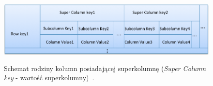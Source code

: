 \begin{figure}[!ht]
 \begin{center}
  \scalebox{0.45}
  {
   \includegraphics{figures/generated_app_type/cassandra_model_supercolumn.png}
  }
 \end{center}
 \caption{Schemat rodziny kolumn posiadającej superkolumnę (\emph{Super Column key} - wartość superkolumny)~\cite{cassandra_model}.}
 \label{fig:cassandra_model_supercolumn}
\end{figure}
